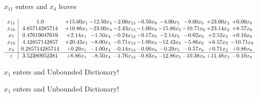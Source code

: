 \documentclass[9pt]{article}
\begin{document}
 $ x_{11} $ enters and $ x_{4} $ leaves 

 \[\begin{array}{c| c c@{\hskip 2pt} c@{\hskip 2pt} c@{\hskip 2pt} c@{\hskip 2pt} c@{\hskip 2pt} c@{\hskip 2pt} c@{\hskip 2pt} c@{\hskip 2pt} }
 x_{11}   &  1.0 & + 15.00 x_{1} & -12.50 x_{4} & -2.00 x_{13} & -0.50 x_{9} & -4.00 x_{5} & -9.00 x_{6} & + 23.00 x_{2} & +  0.00 x_{8}\\
 x_{10}   &  4.85714285714 & + 10.86 x_{1} & -23.00 x_{4} & -2.43 x_{13} & -1.00 x_{9} & -15.86 x_{5} & -10.71 x_{6} & + 23.14 x_{2} & +  8.57 x_{8}\\
 x_{7}   &  0.47619047619 & +  2.14 x_{1} & -1.50 x_{4} & -0.24 x_{13} & -0.17 x_{9} & -2.14 x_{5} & -0.62 x_{6} & +  2.52 x_{2} & +  0.10 x_{8}\\
 x_{12}   &  4.42857142857 & + 20.43 x_{1} & -8.00 x_{4} & -0.71 x_{13} & -1.00 x_{9} & -12.43 x_{5} & -5.86 x_{6} & +  6.57 x_{2} & -10.71 x_{8}\\
 x_{3}   &  0.285714285714 & +  0.29 x_{1} & -1.00 x_{4} & -0.14 x_{13} & -0.00 x_{9} & -0.29 x_{5} & -0.57 x_{6} & +  0.71 x_{2} & +  0.86 x_{8}\\
\hline
z    &  3.52380952381 & +  6.86 x_{1} & -8.50 x_{4} & -1.76 x_{13} & -0.83 x_{9} & -12.86 x_{5} & -10.38 x_{6} & + 11.48 x_{2} & -0.10 x_{8}\\
\end{array}\]


 $ x_{1} $ enters and Unbounded Dictionary!


 $ x_{1} $ enters and Unbounded Dictionary!
\end{document}
